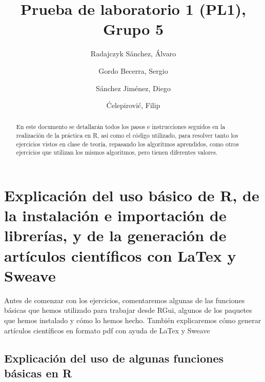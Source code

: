 \documentclass[parskip=full]{scrartcl}
\title{Prueba de laboratorio 1 (PL1), Grupo 5}
\author{
  Radajczyk Sánchez, Álvaro
  \and
  Gordo Becerra, Sergio
  \and
  Sánchez Jiménez, Diego
  \and
  Ćelepirović, Filip
}
\begin{document}
\maketitle

\begin{abstract}

En este documento se detallarán todos los pasos e instrucciones seguidos en la realización de la práctica en R, así como el código utilizado, para resolver tanto los ejercicios vistos en clase de teoría, repasando los algoritmos aprendidos, como otros ejercicios que utilizan los mismos algoritmos, pero tienen diferentes valores.

\end{abstract}

{
  \hypersetup{
    linkcolor=black,
    linktoc=all,
  }
  \tableofcontents
}

\section{Explicación del uso básico de R, de la instalación e importación de librerías, y de la generación de artículos científicos con LaTex y Sweave}

Antes de comenzar con los ejercicios, comentaremos algunas de las funciones básicas que hemos utilizado para trabajar desde RGui, algunos de los paquetes que hemos instalado y cómo lo hemos hecho. También explicaremos cómo generar artículos científicos en formato pdf con ayuda de LaTex y Sweave

\subsection{Explicación del uso de algunas funciones básicas en R}
\end{document}
